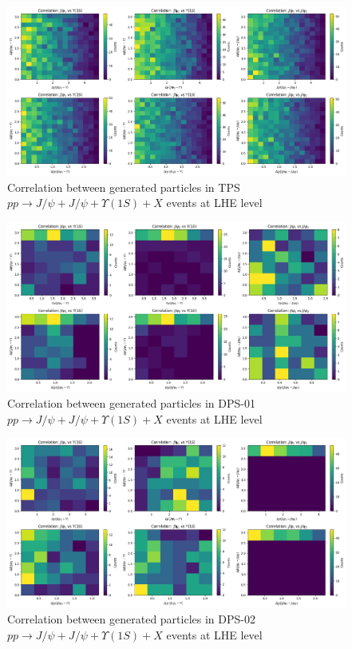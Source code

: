 \documentclass[10pt,twocolumn]{article}
\begin{document}
\begin{figure}[!htbp]
    \centering
    \includegraphics[width=1.0\linewidth]{images/yabs_LHE_LEVEL_TPS_JJY1S_correlation_filtered_p2.png}
    \caption{Correlation between generated particles in TPS $pp\to J/\psi+J/\psi+\Upsilon(1S)+X$ events at LHE level}
    \label{fig:TPS_JJY1S_filtered_correlation_LHE}
\end{figure}

\begin{figure}[!htbp]
    \centering
    \includegraphics[width=1.0\linewidth]{images/yabs_LHE_LEVEL_DPS_JY1S_J_correlation_filtered_p2.png}
    \caption{Correlation between generated particles in DPS-01 $pp\to J/\psi+J/\psi+\Upsilon(1S)+X$ events at LHE level}
    \label{fig:DPS01_JJY1S_filtered_correlation_LHE}
\end{figure}

\begin{figure}[!htbp]
    \centering
    \includegraphics[width=1.0\linewidth]{images/yabs_LHE_LEVEL_DPS_JJ_Y1S_correlation_filtered_p2.png}
    \caption{Correlation between generated particles in DPS-02 $pp\to J/\psi+J/\psi+\Upsilon(1S)+X$ events at LHE level}
    \label{fig:DPS02_JJY1S_filtered_correlation_LHE}
\end{figure}
\end{document}
